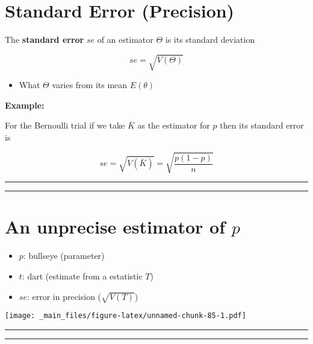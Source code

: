 \documentclass[
]{book}
\providecommand{\tightlist}{%
  \setlength{\itemsep}{0pt}\setlength{\parskip}{0pt}}
\begin{document}
\hypertarget{standard-error-precision}{%
\section{Standard Error (Precision)}\label{standard-error-precision}}

The \textbf{standard error} \(se\) of an estimator \(\Theta\) is its standard deviation

\[se=\sqrt{V(\Theta)}\]

\begin{itemize}
\tightlist
\item
  What \(\Theta\) varies from its mean \(E(\theta)\)
\end{itemize}

\textbf{Example:}

For the Bernoulli trial if we take \(\bar{K}\) as the estimator for \(p\) then its standard error is

\[se=\sqrt{V(\bar{K})}= \sqrt{\frac{p(1-p)}{n}}\]

\begin{center}\rule{0.5\linewidth}{0.5pt}\end{center}

\begin{center}\rule{0.5\linewidth}{0.5pt}\end{center}

\hypertarget{an-unprecise-estimator-of-p}{%
\section{\texorpdfstring{An unprecise estimator of \(p\)}{An unprecise estimator of p}}\label{an-unprecise-estimator-of-p}}

\begin{itemize}
\tightlist
\item
  \(p\): bullseye (parameter)
\item
  \(t\): dart (estimate from a estatistic \(T\))
\item
  \(se\): error in precision (\(\sqrt{V(T)}\))
\end{itemize}

\texttt{[image: \_main\_files/figure-latex/unnamed-chunk-85-1.pdf]}

\begin{center}\rule{0.5\linewidth}{0.5pt}\end{center}

\begin{center}\rule{0.5\linewidth}{0.5pt}\end{center}
\end{document}
